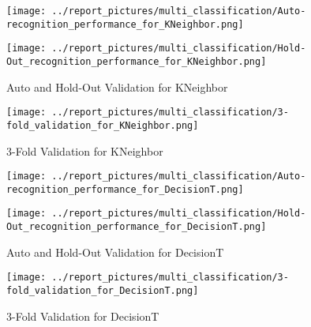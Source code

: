         \begin{figure}[H]
            \begin{minipage}[c]{.46\linewidth}
                  \texttt{[image: ../report\_pictures/multi\_classification/Auto-recognition\_performance\_for\_KNeighbor.png]}
            \end{minipage} \hfill
            \begin{minipage}[c]{.46\linewidth}
                \texttt{[image: ../report\_pictures/multi\_classification/Hold-Out\_recognition\_performance\_for\_KNeighbor.png]}
            \end{minipage}
            \caption{Auto and Hold-Out Validation for KNeighbor}
            \label{CV_KNeighbor}
        \end{figure}   
   
        \begin{figure}[H]
            \texttt{[image: ../report\_pictures/multi\_classification/3-fold\_validation\_for\_KNeighbor.png]}
        \caption{3-Fold Validation for KNeighbor}
        \label{3Fold_KNeighbor}
        \end{figure} 
        
        \begin{figure}[H]
            \begin{minipage}[c]{.46\linewidth}
                  \texttt{[image: ../report\_pictures/multi\_classification/Auto-recognition\_performance\_for\_DecisionT.png]}
            \end{minipage} \hfill
            \begin{minipage}[c]{.46\linewidth}
                \texttt{[image: ../report\_pictures/multi\_classification/Hold-Out\_recognition\_performance\_for\_DecisionT.png]}
            \end{minipage}
            \caption{Auto and Hold-Out Validation for DecisionT}
            \label{CV_DecisionT}
        \end{figure}   
   
        \begin{figure}[H]
            \texttt{[image: ../report\_pictures/multi\_classification/3-fold\_validation\_for\_DecisionT.png]}
        \caption{3-Fold Validation for DecisionT}
        \label{3Fold_DecisionT}
        \end{figure} 
        
